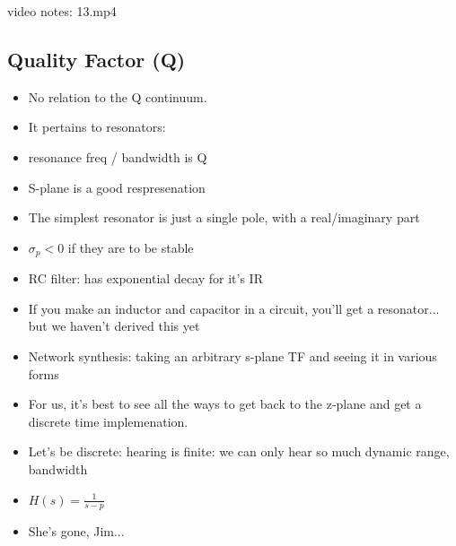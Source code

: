 video notes: 13.mp4


\subsection*{Quality Factor (Q)}
\begin{itemize}

\item{No relation to the Q continuum.}

\item{
It pertains to resonators:
}

\item{resonance freq / bandwidth is Q}

\item{S-plane is a good respresenation}
\item{The simplest resonator is just a single pole, with a 
real/imaginary part}
\item{$\sigma_p < 0$ if they are to be stable}
\item{RC filter: has exponential decay for it's IR}
\item{If you make an inductor and capacitor in a circuit, you'll get a 
resonator... but we haven't derived this yet}
\item{Network synthesis: taking an arbitrary s-plane TF and seeing it in 
various forms}
\item{For us, it's best to see all the ways to get back to the z-plane and get
a discrete time implemenation.}
\item{Let's be discrete: hearing is finite: we can only hear so much dynamic range, bandwidth}
\item{$H(s) = \frac{1}{s - p}$}
\item{She's gone, Jim...}
\end{itemize}
